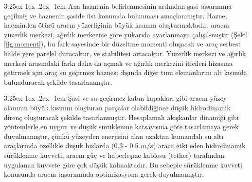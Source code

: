 \documentclass[12pt]{article}
\makeatletter
\renewcommand\paragraph{\@startsection{paragraph}{5}{\z@}%
  {3.25ex \@plus1ex \@minus.2ex}%
  {-1em}%
  {\normalfont\normalsize\bfseries}}
\makeatother
\begin{document}
\paragraph{} Ana haznenin belirlenmesinin ardından şasi tasarımına geçilmiş ve haznenin şaside üst konumda bulunması amaçlanmıştır. Hazne, hacminden ötürü aracın yüzerliğinin büyük kısmını oluşturmaktadır, aracın yüzerlik merkezi, ağırlık merkezine göre yukarıda ayarlanmaya çalışıl-mıştır (Şekil \ref{fig:moment}), bu fark sayesinde bir düzeltme momenti oluşacak ve araç serbest halde yere parelel duracaktır, ve stabilitesi artacaktır.\cite{BOOK:rovmanual} Yüzerlik merkezi ve ağırlık merkezi arasındaki farkı daha da açmak ve ağırlık merkezini iticileri hizasına getirmek için araç su geçirmez haznesi dışında diğer tüm elemanlarını alt kısımda bulunduracak şekilde tasarlanmıştır.

\newpage

\paragraph{} Şasi ve su geçirmez kabın kapakları gibi aracın yüzey alanının büyük kısmını oluşturan parçalar olabildiğince düşük hidrodinamik direnç oluşturacak şekilde tasarlanmıştır. Hesaplamalı akışkanlar dinamiği gibi yöntemlerle en uygun ve düşük sürüklenme katsayısına göre tasarlamaya gerek duyulmamıştır, çünkü yüzeyden enerjisini alan uzaktan kumandalı su altı araçlarında özellikle düşük hızlarda (0.3 - 0.5 $m/s$) araca etki eden hidrodinamik sürüklenme kuvveti, aracın güç ve haberleşme kablosu (tether) tarafından uygulanan kuvvete göre çok düşük kalmaktadır.\cite{BOOK:rovmanual} Bu sebeple sürüklenme kuvveti konusunda aracın tasarımında optimizasyona gerek duyulmamıştır.
\end{document}
